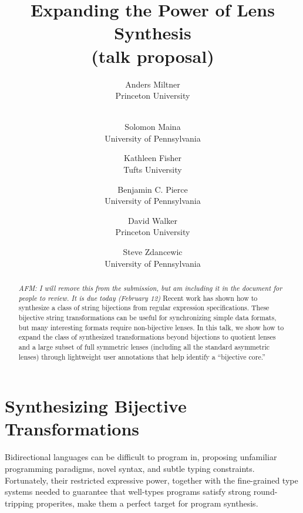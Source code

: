 \documentclass[a4paper]{article}
\title{Expanding the Power of Lens Synthesis \\ (talk proposal)}
\author{
Anders Miltner \\ Princeton University \\ \ 
\and
Solomon Maina \\ University of Pennsylvania
\and
Kathleen Fisher \\ Tufts University
\and
Benjamin C. Pierce \\ University of Pennsylvania
\and
David Walker \\ Princeton University
\and
Steve Zdancewic \\ University of Pennsylvania
}
\begin{document}
\maketitle



\begin{abstract}
  {\color{dkblue} \emph{AFM: I will remove this from the submission, but am including it in the
    document for people to review. It is due today (February 12)}} Recent work
  has shown how to synthesize a class of string bijections from regular
  expression specifications. These bijective string transformations can be
  useful for synchronizing simple data formats, but many interesting formats
  require non-bijective lenses. In this talk, we show how to expand the class of
  synthesized transformations beyond bijections to quotient lenses and a large
  subset of full symmetric lenses (including all the standard asymmetric lenses)
  through lightweight user annotations that help identify a ``bijective core.''
\end{abstract}

\section{Synthesizing Bijective Transformations}

Bidirectional languages can be difficult to program in, proposing unfamiliar
programming paradigms, novel syntax, and subtle typing constraints.
Fortunately, their restricted expressive power, together with the
fine-grained type systems needed to guarantee that well-types programs
satisfy strong round-tripping properites, make them a perfect target for
program synthesis.  
\end{document}
